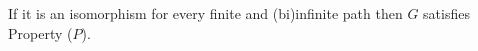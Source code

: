 \documentclass[preview]{standalone}
\begin{document}
If it is an isomorphism for every finite and (bi)infinite path then $G$ satisfies Property ($P$).\\
\end{document}

